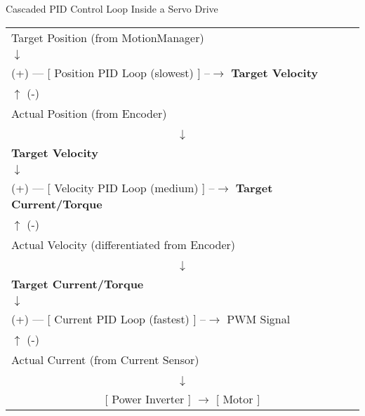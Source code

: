     \begin{infobox}{Cascaded PID Control Loop Inside a Servo Drive}
    \ttfamily\small %
    \renewcommand{\arraystretch}{1} %
    \begin{tabular}{l}
        Target Position \tiny{(from MotionManager)} \\
        \quad\quad $\downarrow$ \\
        (+) --- [ Position PID Loop (slowest) ] --$\rightarrow$ \textbf{Target Velocity} \\
        \quad\quad $\uparrow$ (-) \\
        Actual Position \tiny{(from Encoder)} \\
        \\
        \multicolumn{1}{c}{$\downarrow$} \\
        
        \textbf{Target Velocity} \\
        \quad\quad $\downarrow$ \\
        (+) --- [ Velocity PID Loop (medium) ] --$\rightarrow$ \textbf{Target Current/Torque} \\
        \quad\quad $\uparrow$ (-) \\
        Actual Velocity \tiny{(differentiated from Encoder)} \\
        \\
        \multicolumn{1}{c}{$\downarrow$} \\

        \textbf{Target Current/Torque} \\
        \quad\quad $\downarrow$ \\
        (+) --- [ Current PID Loop (fastest) ] --$\rightarrow$ PWM Signal \\
        \quad\quad $\uparrow$ (-) \\
        Actual Current \tiny{(from Current Sensor)} \\
        \\
        \multicolumn{1}{c}{$\downarrow$} \\
        \multicolumn{1}{c}{[ Power Inverter ] $\rightarrow$ [ Motor ]} \\
    \end{tabular}
    \end{infobox}
    \caption{The structure of a cascaded PID controller in a modern servo drive. Each loop corrects a different physical quantity, with the inner loops running significantly faster than the outer ones.}
    \label{fig:cascade_pid_pseudo}



